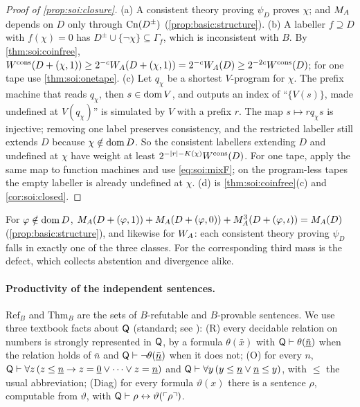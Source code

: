 \begin{proof}[Proof of \cref{prop:soi:closure}]
(a) A consistent theory proving $\psi_D$ proves $\chi$; and $M_{A}$ depends on $D$ only through $\mathrm{Cn}(D^\pm)$ (\cref{prop:basic:structure}). (b) A labeller $f\supseteq D$ with $f(\chi)=0$ has $D^\pm\cup\{\neg\chi\}\subseteq\Gamma_f$, which is inconsistent with $B$. By \cref{thm:soi:coinfree}, $W^{\mathrm{cons}}(D+(\chi,1))\ge2^{-c}W_{A}(D+(\chi,1))=2^{-c}W_{A}(D)\ge2^{-2c}W^{\mathrm{cons}}(D)$; for one tape use \cref{thm:soi:onetape}. (c) Let $q_\chi$ be a shortest $V$-program for $\chi$. The prefix machine that reads $q_\chi$, then $s\in\operatorname{dom} V$, and outputs an index of ``$\{V(s)\}$, made undefined at $V(q_\chi)$'' is simulated by $V$ with a prefix $r$. The map $s\mapsto rq_\chi s$ is injective; removing one label preserves consistency, and the restricted labeller still extends $D$ because $\chi\notin\operatorname{dom} D$. So the consistent labellers extending $D$ and undefined at $\chi$ have weight at least $2^{-\lvert r\rvert-K(\chi)}W^{\mathrm{cons}}(D)$. For one tape, apply the same map to function machines and use \eqref{eq:soi:mixF}; on the program-less tapes the empty labeller is already undefined at $\chi$. (d) is \cref{thm:soi:coinfree}(c) and \cref{cor:soi:closed}.
\end{proof}

\begin{remark}\label{rem:soi:outcomes}
For $\varphi\notin\operatorname{dom} D$, $M_{A}(D+(\varphi,1))+M_{A}(D+(\varphi,0))+M_{A}^{3}(D+(\varphi,\iota))=M_{A}(D)$ (\cref{prop:basic:structure}), and likewise for $W_{A}$: each consistent theory proving $\psi_D$ falls in exactly one of the three classes. For \SOIabbr the corresponding third mass is the defect, which collects abstention and divergence alike.
\end{remark}

\paragraph{Productivity of the independent sentences.} $\mathrm{Ref}_B$ and $\mathrm{Thm}_B$ are the sets of $B$-refutable and $B$-provable sentences. We use three textbook facts about $\mathsf{Q}$ (standard; see \citealp{boolos2007computability}): (R) every decidable relation on numbers is strongly represented in $\mathsf{Q}$, by a formula $\theta(\bar x)$ with $\mathsf{Q}\vdash\theta(\bar{\underline{n}})$ when the relation holds of $\bar n$ and $\mathsf{Q}\vdash\neg\theta(\bar{\underline{n}})$ when it does not; (O) for every $n$, $\mathsf{Q}\vdash\forall z\,(z\le\underline{n}\to z=\underline{0}\vee\dots\vee z=\underline{n})$ and $\mathsf{Q}\vdash\forall y\,(y\le\underline{n}\vee\underline{n}\le y)$, with $\le$ the usual abbreviation; (Diag) for every formula $\vartheta(x)$ there is a sentence $\rho$, computable from $\vartheta$, with $\mathsf{Q}\vdash\rho\leftrightarrow\vartheta(\ulcorner \rho\urcorner)$.

